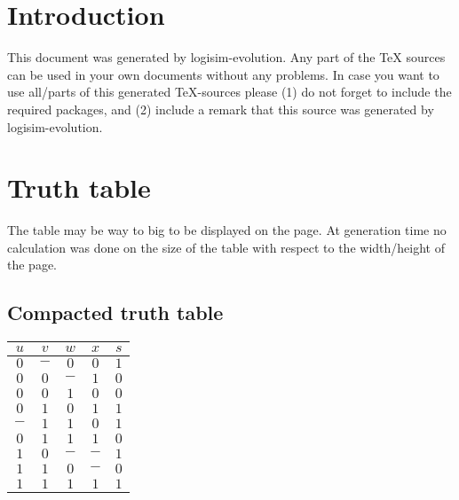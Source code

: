 \documentclass [15pt,a4paper,twoside]{article}
\begin{document}
\section{Introduction}
This document was generated by logisim-evolution. Any part of the TeX sources can be used in your own documents without any problems. In case you want to use all/parts of this generated TeX-sources please (1) do not forget to include the required packages, and (2) include a remark that this source was generated by logisim-evolution.
\section{Truth table}
The table may be way to big to be displayed on the page. At generation time no calculation was done on the size of the table with respect to the width/height of the page.
\subsection{Compacted truth table}
\begin{center}
\begin{tabular}{cccc|c}
$u$&$v$&$w$&$x$&$s$\\
\hline
$0$&$-$&$0$&$0$&$1$\\
$0$&$0$&$-$&$1$&$0$\\
$0$&$0$&$1$&$0$&$0$\\
$0$&$1$&$0$&$1$&$1$\\
$-$&$1$&$1$&$0$&$1$\\
$0$&$1$&$1$&$1$&$0$\\
$1$&$0$&$-$&$-$&$1$\\
$1$&$1$&$0$&$-$&$0$\\
$1$&$1$&$1$&$1$&$1$\\

\end{tabular}
\end{center}
\end{document}
